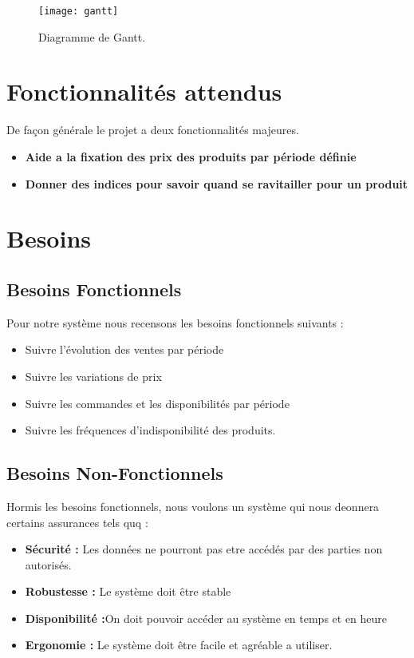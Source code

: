 \begin{figure}[H]
    \centering
    \texttt{[image: gantt]}
    \caption{Diagramme de Gantt.}
    \label{fig:gantt}
\end{figure}


\section{Fonctionnalités attendus}
De façon générale le projet a deux fonctionnalités majeures. 
\begin{itemize}
    \item \textbf{Aide a la fixation des prix des produits par période définie}
    \item \textbf{Donner des indices pour savoir quand se ravitailler pour un produit}
\end{itemize}


\section{Besoins}
\subsection{Besoins Fonctionnels}
Pour notre système nous recensons les besoins fonctionnels suivants :
\begin{itemize}
    \item Suivre l'évolution des ventes par période
    \item Suivre les variations de prix 
    \item Suivre les commandes et les disponibilités par période
    \item Suivre les fréquences d'indisponibilité des produits.
\end{itemize}
\subsection{Besoins Non-Fonctionnels}
Hormis les besoins fonctionnels, nous voulons un système qui nous deonnera certains assurances tels quq :
\begin{itemize}
    \item \textbf{Sécurité : }Les données ne pourront pas etre accédés par des parties non autorisés.
    \item \textbf{Robustesse : }Le système doit être stable 
    \item \textbf{Disponibilité :}On doit pouvoir accéder au système en temps et en heure
    \item \textbf{Ergonomie : }Le système doit être facile et agréable a utiliser.
\end{itemize}
